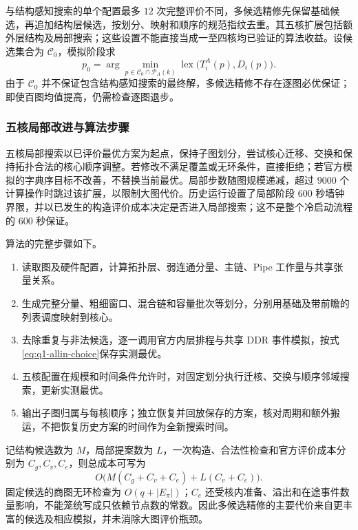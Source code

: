 与结构感知搜索的单个配置最多 $12$ 次完整评价不同，多候选精修先保留基础候选，再追加结构层候选，按划分、映射和顺序的规范指纹去重。其五核扩展包括额外层结构及局部搜索；这些设置不能直接当成一至四核均已验证的算法收益。设候选集合为 $\mathcal C_0$，模拟阶段求
\begin{equation}\label{eq:q1-allin-choice}
p_0=\arg\min_{p\in\mathcal C_0\cap\mathcal P_A(k)}
\operatorname{lex}\bigl(T_i^A(p),D_i(p)\bigr).
\end{equation}
由于 $\mathcal C_0$ 并不保证包含结构感知搜索的最终解，多候选精修不存在逐图必优保证；即使百图均值提高，仍需检查逐图退步。

\subsubsection{五核局部改进与算法步骤}
五核局部搜索以已评价最优方案为起点，保持子图划分，尝试核心迁移、交换和保持拓扑合法的核心顺序调整。若修改不满足覆盖或无环条件，直接拒绝；若官方模拟的字典序目标不改善，不替换当前最优。局部步数随图规模递减，超过 $9000$ 个计算操作时跳过该扩展，以限制大图代价。历史运行设置了局部阶段 $600$ 秒墙钟界限，并以已发生的构造评价成本决定是否进入局部搜索；这不是整个冷启动流程的 $600$ 秒保证。

算法的完整步骤如下。
\begin{enumerate}
\item 读取图及硬件配置，计算拓扑层、弱连通分量、主链、Pipe 工作量与共享张量关系。
\item 生成完整分量、粗细窗口、混合链和容量批次等划分，分别用基础及带前瞻的列表调度映射到核心。
\item 去除重复与非法候选，逐一调用官方内层排程与共享 DDR 事件模拟，按式\eqref{eq:q1-allin-choice}保存实测最优。
\item 五核配置在规模和时间条件允许时，对固定划分执行迁核、交换与顺序邻域搜索，更新实测最优。
\item 输出子图归属与每核顺序；独立恢复并回放保存的方案，核对周期和额外搬运，不把恢复历史方案的时间作为全新搜索时间。
\end{enumerate}
记结构候选数为 $M$，局部提案数为 $L$，一次构造、合法性检查和官方评价成本分别为 $C_g,C_v,C_e$，则总成本可写为
\begin{equation}\label{eq:q1-allin-complexity}
O\bigl(M(C_g+C_v+C_e)+L(C_v+C_e)\bigr).
\end{equation}
固定候选的商图无环检查为 $O(q+|E_\pi|)$；$C_e$ 还受核内准备、溢出和在途事件数量影响，不能笼统写成只依赖节点数的常数。因此多候选精修的主要代价来自更丰富的候选及相应模拟，并未消除大图评价瓶颈。


